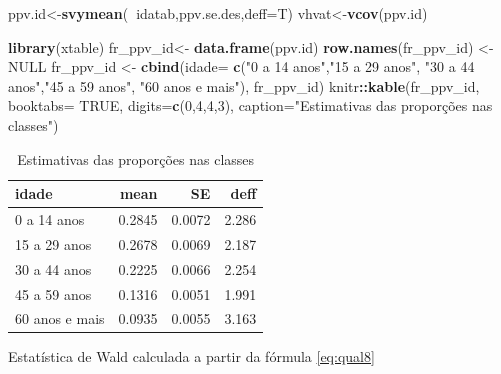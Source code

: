 \documentclass[]{book}
\newenvironment{Shaded}{\begin{snugshade}}{\end{snugshade}}
\newcommand{\KeywordTok}[1]{\textcolor[rgb]{0.13,0.29,0.53}{\textbf{#1}}}
\newcommand{\DataTypeTok}[1]{\textcolor[rgb]{0.13,0.29,0.53}{#1}}
\newcommand{\DecValTok}[1]{\textcolor[rgb]{0.00,0.00,0.81}{#1}}
\newcommand{\StringTok}[1]{\textcolor[rgb]{0.31,0.60,0.02}{#1}}
\newcommand{\OtherTok}[1]{\textcolor[rgb]{0.56,0.35,0.01}{#1}}
\newcommand{\OperatorTok}[1]{\textcolor[rgb]{0.81,0.36,0.00}{\textbf{#1}}}
\newcommand{\NormalTok}[1]{#1}
\theoremstyle{definition}
\theoremstyle{definition}
\theoremstyle{definition}
\theoremstyle{remark}
\begin{document}
\begin{Shaded}
\begin{Highlighting}[]
\NormalTok{ppv.id<-}\KeywordTok{svymean}\NormalTok{(}\OperatorTok{~}\NormalTok{idatab,ppv.se.des,}\DataTypeTok{deff=}\NormalTok{T)}
\NormalTok{vhvat<-}\KeywordTok{vcov}\NormalTok{(ppv.id)}
\end{Highlighting}
\end{Shaded}

\begin{Shaded}
\begin{Highlighting}[]
\KeywordTok{library}\NormalTok{(xtable)}
\NormalTok{fr_ppv_id<-}\StringTok{ }\KeywordTok{data.frame}\NormalTok{(ppv.id)}
\KeywordTok{row.names}\NormalTok{(fr_ppv_id) <-}\StringTok{ }\OtherTok{NULL}
\NormalTok{fr_ppv_id <-}\StringTok{ }\KeywordTok{cbind}\NormalTok{(}\DataTypeTok{idade=} \KeywordTok{c}\NormalTok{(}\StringTok{"0 a 14 anos"}\NormalTok{,}\StringTok{"15 a 29 anos"}\NormalTok{, }\StringTok{"30 a 44 anos"}\NormalTok{,}\StringTok{"45 a 59 anos"}\NormalTok{, }\StringTok{"60 anos e mais"}\NormalTok{), fr_ppv_id)}
\NormalTok{knitr}\OperatorTok{::}\KeywordTok{kable}\NormalTok{(fr_ppv_id, }\DataTypeTok{booktabs=} \OtherTok{TRUE}\NormalTok{, }\DataTypeTok{digits=}\KeywordTok{c}\NormalTok{(}\DecValTok{0}\NormalTok{,}\DecValTok{4}\NormalTok{,}\DecValTok{4}\NormalTok{,}\DecValTok{3}\NormalTok{), }\DataTypeTok{caption=}\StringTok{"Estimativas das proporções nas classes"}\NormalTok{) }
\end{Highlighting}
\end{Shaded}

\begin{table}

\caption{\label{tab:estpropclas}Estimativas das proporções nas classes}
\centering
\begin{tabular}[t]{lrrr}
\toprule
idade & mean & SE & deff\\
\midrule
0 a 14 anos & 0.2845 & 0.0072 & 2.286\\
15 a 29 anos & 0.2678 & 0.0069 & 2.187\\
30 a 44 anos & 0.2225 & 0.0066 & 2.254\\
45 a 59 anos & 0.1316 & 0.0051 & 1.991\\
60 anos e mais & 0.0935 & 0.0055 & 3.163\\
\bottomrule
\end{tabular}
\end{table}

Estatística de Wald calculada a partir da fórmula \eqref{eq:qual8}
\end{document}
